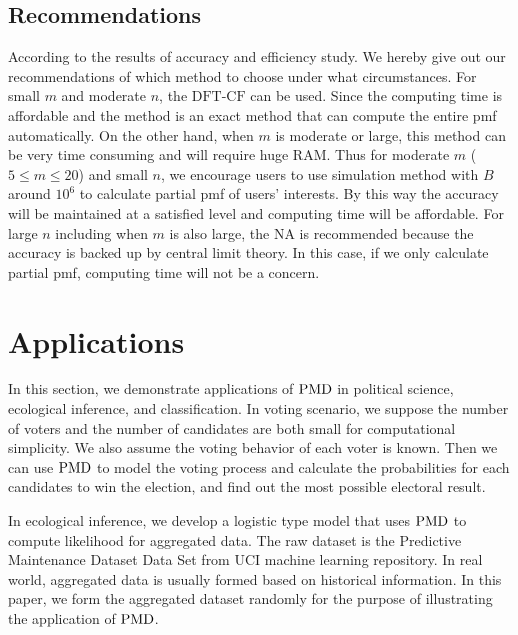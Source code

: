 \documentclass[12pt]{article}
\newcommand{\PMD}{{\normalfont\textrm{PMD}}}
\newcommand{\NA}{{\textrm{NA}}}
\newcommand{\dft}{{\textrm{DFT-CF}}}
\begin{document}
\subsection{Recommendations}
According to the results of accuracy and efficiency study. We hereby give out our recommendations of which method to choose under what circumstances. For small $m$ and moderate $n$, the $\dft$ can be used. Since the computing time is affordable and the method is an exact method that can compute the entire pmf automatically. On the other hand, when $m$ is moderate or large, this method can be very time consuming and will require huge RAM. Thus for moderate $m$ ($5 \leq m \leq 20$) and small $n$, we encourage users to use simulation method with $B$ around $10^6$ to calculate partial pmf of users' interests. By this way the accuracy will be maintained at a satisfied level and computing time will be affordable. For large $n$ including when $m$ is also large, the $\NA$ is recommended because the accuracy is backed up by central limit theory. In this case, if we only calculate partial pmf, computing time will not be a concern.

\section{Applications}\label{sec:applications}

In this section, we demonstrate applications of $\PMD$ in political science, ecological inference, and classification. In voting scenario, we suppose the number of voters and the number of candidates are both small for computational simplicity. We also assume the voting behavior of each voter is known. Then we can use $\PMD$ to model the voting process and calculate the probabilities for each candidates to win the election, and find out the most possible electoral result.

In ecological inference, we develop a logistic type model that uses $\PMD$ to compute likelihood for aggregated data. The raw dataset is the Predictive Maintenance Dataset Data Set \cite{Dua:2019} from UCI machine learning repository. In real world, aggregated data is usually formed based on historical information. In this paper, we form the aggregated dataset randomly for the purpose of illustrating the application of $\PMD$.
\end{document}
